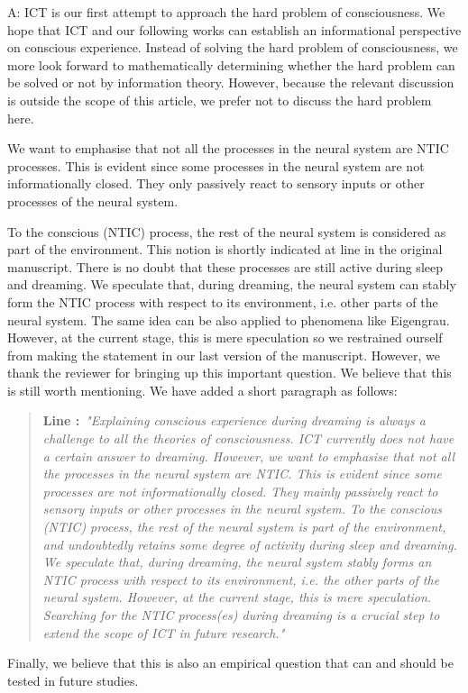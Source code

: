 \documentclass[utf8]{article}
\newenvironment{ans}  
    {\color{Black}\noindent A:}
    {~\newline}
\newcommand{\addnew}[2]{\blockcquote{}{\textbf{Line #1:}~\newline\textit{"#2"}}
}
\begin{document}
    	\begin{ans}
    		ICT is our first attempt to approach the hard problem of consciousness. We hope that ICT and our following works can establish an informational perspective on conscious experience. Instead of solving the hard problem of consciousness, we more look forward to mathematically determining whether the hard problem can be solved or not by information theory. However, because the relevant discussion is outside the scope of this article, we prefer not to discuss the hard problem here.
    		
			We want to emphasise that not all the processes in the neural system are NTIC processes. This is evident since some processes in the neural system are not informationally closed. They only passively react to sensory inputs or other processes of the neural system. 

    		To the conscious (NTIC) process, the rest of the neural system is considered as part of the environment. This notion is shortly indicated at line  in the original manuscript. There is no doubt that these processes are still active during sleep and dreaming. We speculate that, during dreaming, the neural system can stably form the NTIC process with respect to its environment, i.e. other parts of the neural system. The same idea can be also applied to phenomena like Eigengrau. However, at the current stage, this is mere speculation so we restrained ourself from making the statement in our last version of the manuscript. However, we thank the reviewer for bringing up this important question. We believe that this is still worth mentioning. We have added a short paragraph as follows:
    		
    		\addnew{}{Explaining conscious experience during dreaming is always a challenge to all the theories of consciousness. ICT currently does not have a certain answer to dreaming. However, we want to emphasise that not all the processes in the neural system are NTIC. This is evident since some processes are not informationally closed. They mainly passively react to sensory inputs or other processes in the neural system. To the conscious (NTIC) process, the rest of the neural system is part of the environment, and undoubtedly retains some degree of activity during sleep and dreaming. We speculate that, during dreaming, the neural system stably forms an NTIC process with respect to its environment, i.e. the other parts of the neural system. However, at the current stage, this is mere speculation. Searching for the NTIC process(es) during dreaming is a crucial step to extend the scope of ICT in future research.}
    		    
    		Finally, we believe that this is also an
    		empirical question that can and should be tested in future studies. 
    	\end{ans}

	
\end{document}
